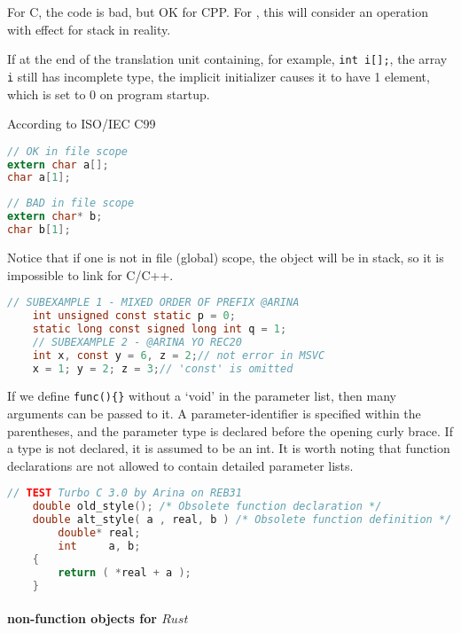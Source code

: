 For {C}, the code is bad, but OK for {CPP}. For , this will consider an operation with effect for stack in reality.

If at the end of the translation unit containing, for example, \verb`int i[];`, the array \verb`i` still has incomplete type, the implicit initializer causes it to have 1 element, which is set to 0 on program startup.

According to ISO/IEC C99
\lstset{style=GlobalC}
\begin{lstlisting}[language=C]
// OK in file scope
extern char a[];
char a[1];
\end{lstlisting}
\begin{lstlisting}[language=C]
// BAD in file scope
extern char* b;
char b[1];
\end{lstlisting}
Notice that if one is not in file (global) scope, the object will be in stack, so it is impossible to link for C/C++.

\begin{lstlisting}[language=C]
	// SUBEXAMPLE 1 - MIXED ORDER OF PREFIX @ARINA
	int unsigned const static p = 0;
	static long const signed long int q = 1;
	// SUBEXAMPLE 2 - @ARINA YO REC20
	int x, const y = 6, z = 2;// not error in MSVC
	x = 1; y = 2; z = 3;// 'const' is omitted
\end{lstlisting}


If we define \verb`func(){}` without a `void' in the parameter list, then many arguments can be passed to it.
A parameter-identifier is specified within the parentheses, and the parameter type is declared before the opening curly brace.
If a type is not declared, it is assumed to be an int.
It is worth noting that function declarations are not allowed to contain detailed parameter lists.

\begin{lstlisting}[language=C]
	// TEST Turbo C 3.0 by Arina on REB31
	double old_style(); /* Obsolete function declaration */
	double alt_style( a , real, b ) /* Obsolete function definition */
		double* real;
		int     a, b;
	{
		return ( *real + a );
	}
\end{lstlisting}


\paragraph{non-function objects for $Rust$} \

